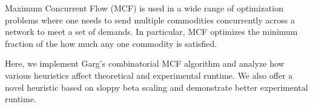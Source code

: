 
Maximum Concurrent Flow (MCF) is used in a wide range of optimization problems where one needs to send multiple
commodities concurrently across a network to meet a set of demands. In particular, MCF optimizes the minimum fraction of
the how much any one commodity is satisfied.

Here, we implement Garg's combinatorial MCF algorithm and analyze how various heuristics affect theoretical and
experimental runtime.  We also offer a novel heuristic based on sloppy beta scaling and demonstrate better experimental
runtime.

